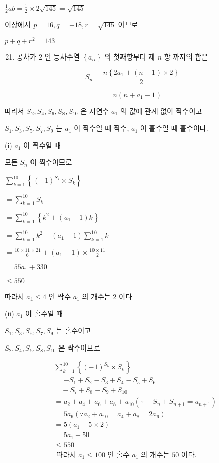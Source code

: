 \documentclass[10pt]{article}
\begin{document}
\(\frac{1}{2} a b=\frac{1}{2} \times 2 \sqrt{145}=\sqrt{145}\)

이상에서 \(p=16, q=-18, r=\sqrt{145}\) 이므로

\(p+q+r^{2}=143\)

\begin{enumerate}
  \setcounter{enumi}{20}
  \item 공차가 2 인 등차수열 \(\left\{a_{n}\right\}\) 의 첫째항부터 제 \(n\) 항 까지의 합은
\end{enumerate}

\[
S_{n}=\frac{n\left\{2 a_{1}+(n-1) \times 2\right\}}{2}
\]

\[
=n\left(n+a_{1}-1\right)
\]

따라서 \(S_{2}, S_{4}, S_{6}, S_{8}, S_{10}\) 은 자연수 \(a_{1}\) 의 값에 관계 없이 짝수이고

\(S_{1}, S_{3}, S_{5}, S_{7}, S_{9}\) 는 \(a_{1}\) 이 짝수일 때 짝수, \(a_{1}\) 이 홀수일 때 홀수이다.

(i) \(a_{1}\) 이 짝수일 때

모든 \(S_{n}\) 이 짝수이므로

\(\sum_{k=1}^{10}\left\{(-1)^{S_{k}} \times S_{k}\right\}\)

\(=\sum_{k=1}^{10} S_{k}\)

\(=\sum_{k=1}^{10}\left\{k^{2}+\left(a_{1}-1\right) k\right\}\)

\(=\sum_{k=1}^{10} k^{2}+\left(a_{1}-1\right) \sum_{k=1}^{10} k\)

\(=\frac{10 \times 11 \times 21}{6}+\left(a_{1}-1\right) \times \frac{10 \times 11}{2}\)

\(=55 a_{1}+330\)

\(\leq 550\)

따라서 \(a_{1} \leq 4\) 인 짝수 \(a_{1}\) 의 개수는 2 이다

(ii) \(a_{1}\) 이 홀수일 때

\(S_{1}, S_{3}, S_{5}, S_{7}, S_{9}\) 는 홀수이고

\(S_{2}, S_{4}, S_{6}, S_{8}, S_{10}\) 은 짝수이므로

\[
\begin{aligned}
& \sum_{k=1}^{10}\left\{(-1)^{S_{k}} \times S_{k}\right\} \\
& =-S_{1}+S_{2}-S_{3}+S_{4}-S_{5}+S_{6} \\
& \quad-S_{7}+S_{8}-S_{9}+S_{10} \\
& =a_{2}+a_{4}+a_{6}+a_{8}+a_{10}\left(\because-S_{n}+S_{n+1}=a_{n+1}\right) \\
& =5 a_{6}\left(\because a_{2}+a_{10}=a_{4}+a_{8}=2 a_{6}\right) \\
& =5\left(a_{1}+5 \times 2\right) \\
& =5 a_{1}+50 \\
& \leq 550 \\
& \text { 따라서 } a_{1} \leq 100 \text { 인 홀수 } a_{1} \text { 의 개수는 } 50 \text { 이다. }
\end{aligned}
\]
\end{document}
